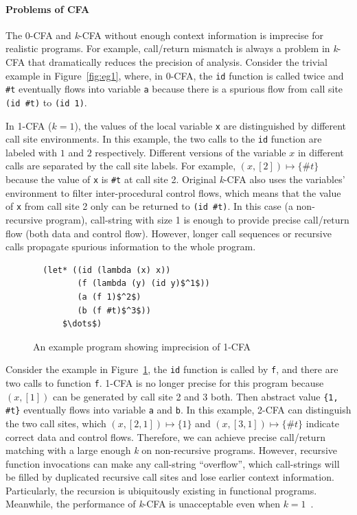 \documentclass[12pt]{report}
\begin{document}
\paragraph{Problems of CFA}
The 0-CFA and \textit{k}-CFA without enough context information is imprecise for realistic programs.
For example, call/return mismatch is always a problem in \textit{k}-CFA that dramatically reduces the precision of analysis.
Consider the trivial example in Figure~\ref{fig:eg1}, where, in 0-CFA, the \verb|id| function is called twice and \verb|#t| eventually flows into variable \verb|a| because there is a spurious flow from call site
\verb|(id #t)| to \verb|(id 1)|.

In 1-CFA ($k = 1$), the values of the local variable \verb|x| are distinguished by different call site environments.
In this example, the two calls to the \verb|id| function are labeled with $1$ and $2$ respectively.
Different versions of the variable $x$ in different calls are separated by the call site labels.
For example, $(x, [2]) \mapsto \{\#t\}$ because the value of \verb|x| is \verb|#t| at call site 2.
Original \textit{k}-CFA also uses the variables' environment to filter inter-procedural control flows,
which means that the value of \verb|x| from call site 2 only can be returned to \verb|(id #t)|.
In this case (a non-recursive program), call-string with size 1 is enough to provide precise call/return flow
(both data and control flow).
However, longer call sequences or recursive calls propagate spurious information to the whole program.

\begin{figure}
\begin{lstlisting}
  (let* ((id (lambda (x) x))
         (f (lambda (y) (id y)$^1$))
         (a (f 1)$^2$)
         (b (f #t)$^3$))
      $\dots$)
\end{lstlisting}
\caption{An example program showing imprecision of 1-CFA}
\label{fig:eg2}
\end{figure}

Consider the example in Figure~\ref{fig:eg2}, the \verb|id| function is called by \verb|f|, and there are two calls to function \verb|f|.
1-CFA is no longer precise for this program because $(x, [1])$ can be generated by call site 2 and 3 both.
Then abstract value \verb|{1, #t}| eventually flows into variable \verb|a| and \verb|b|.
In this example, 2-CFA can distinguish the two call sites, which $(x, [2, 1]) \mapsto \{1\}$ and $(x, [3, 1]) \mapsto  \{\#t\}$ indicate correct data and control flows.
Therefore, we can achieve precise call/return matching with a large enough \textit{k} on non-recursive programs.
However, recursive function invocations can make any call-string ``overflow'', which call-strings will be filled by duplicated recursive call sites and lose earlier context information.
Particularly, the recursion is ubiquitously existing in functional programs.
Meanwhile, the performance of \textit{k}-CFA is unacceptable even when $k = 1$~\cite{van2008deciding}.
\end{document}
